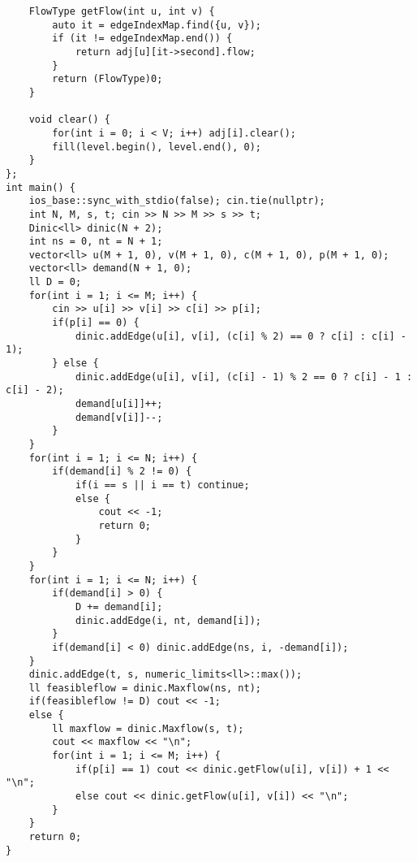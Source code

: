 \documentclass[landscape, 8pt, a4paper, oneside, twocolumn]{extarticle}
\begin{document}
\begin{verbatim}
    FlowType getFlow(int u, int v) {
        auto it = edgeIndexMap.find({u, v});
        if (it != edgeIndexMap.end()) {
            return adj[u][it->second].flow;
        }
        return (FlowType)0;
    }

    void clear() {
        for(int i = 0; i < V; i++) adj[i].clear();
        fill(level.begin(), level.end(), 0);
    }
};
int main() {
    ios_base::sync_with_stdio(false); cin.tie(nullptr);
    int N, M, s, t; cin >> N >> M >> s >> t;
    Dinic<ll> dinic(N + 2);
    int ns = 0, nt = N + 1;
    vector<ll> u(M + 1, 0), v(M + 1, 0), c(M + 1, 0), p(M + 1, 0);
    vector<ll> demand(N + 1, 0);
    ll D = 0;
    for(int i = 1; i <= M; i++) {
        cin >> u[i] >> v[i] >> c[i] >> p[i];
        if(p[i] == 0) {
            dinic.addEdge(u[i], v[i], (c[i] % 2) == 0 ? c[i] : c[i] - 1);
        } else {
            dinic.addEdge(u[i], v[i], (c[i] - 1) % 2 == 0 ? c[i] - 1 : c[i] - 2);
            demand[u[i]]++;
            demand[v[i]]--;
        }
    }
    for(int i = 1; i <= N; i++) {
        if(demand[i] % 2 != 0) {
            if(i == s || i == t) continue;
            else {
                cout << -1;
                return 0;
            }
        }
    }
    for(int i = 1; i <= N; i++) {
        if(demand[i] > 0) {
            D += demand[i];
            dinic.addEdge(i, nt, demand[i]);
        }
        if(demand[i] < 0) dinic.addEdge(ns, i, -demand[i]);
    }
    dinic.addEdge(t, s, numeric_limits<ll>::max());
    ll feasibleflow = dinic.Maxflow(ns, nt);
    if(feasibleflow != D) cout << -1;
    else {
        ll maxflow = dinic.Maxflow(s, t);
        cout << maxflow << "\n";
        for(int i = 1; i <= M; i++) {
            if(p[i] == 1) cout << dinic.getFlow(u[i], v[i]) + 1 << "\n";
            else cout << dinic.getFlow(u[i], v[i]) << "\n";
        }
    }
    return 0;
}
    \end{verbatim}
\end{document}
